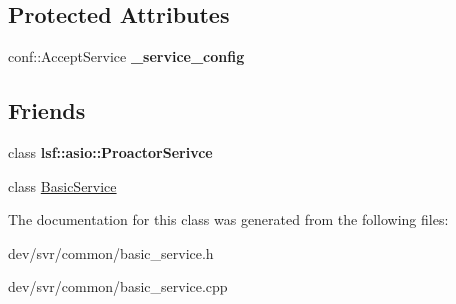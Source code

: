 \subsection*{Protected Attributes}
\begin{DoxyCompactItemize}
\item 
\hypertarget{classBasicAcceptService_af89061851ad90a459b97fb1eb8390e33}{
conf::AcceptService {\bfseries \_\-service\_\-config}}
\label{classBasicAcceptService_af89061851ad90a459b97fb1eb8390e33}

\end{DoxyCompactItemize}
\subsection*{Friends}
\begin{DoxyCompactItemize}
\item 
\hypertarget{classBasicAcceptService_a8e807eb450b87a443cee5956b3d556d3}{
class {\bfseries lsf::asio::ProactorSerivce}}
\label{classBasicAcceptService_a8e807eb450b87a443cee5956b3d556d3}

\item 
\hypertarget{classBasicAcceptService_ae76adcf38331892fcc17b32e98f08bc7}{
class \hyperlink{classBasicAcceptService_ae76adcf38331892fcc17b32e98f08bc7}{BasicService}}
\label{classBasicAcceptService_ae76adcf38331892fcc17b32e98f08bc7}

\end{DoxyCompactItemize}


The documentation for this class was generated from the following files:\begin{DoxyCompactItemize}
\item 
dev/svr/common/basic\_\-service.h\item 
dev/svr/common/basic\_\-service.cpp\end{DoxyCompactItemize}
